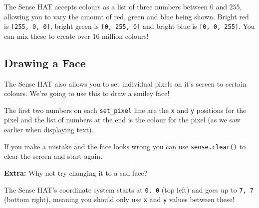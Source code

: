 		\begin{aside}
			The Sense HAT accepts colours as a list of three numbers between 0 and 255, allowing you to vary the amount of red, green and blue being shown. Bright red is \texttt{[255, 0, 0]}, bright green is \texttt{[0, 255, 0]} and bright blue is \texttt{[0, 0, 255]}. You can mix these to create over 16 million colours!
		\end{aside}

	\subsection{Drawing a Face}

		The Sense HAT also allows you to set individual pixels on it's screen to certain colours. We're going to use this to draw a smiley face!

		

		The first two numbers on each \texttt{set\_pixel} line are the \texttt{x} and \texttt{y} positions for the pixel and the list of numbers at the end is the colour for the pixel (as we saw earlier when displaying text).

		If you make a mistake and the face looks wrong you can use \texttt{sense.clear()} to clear the screen and start again.

		\textbf{Extra:} Why not try changing it to a sad face?

		\begin{aside}
			The Sense HAT's coordinate system starts at \texttt{0, 0} (top left) and goes up to \texttt{7, 7} (bottom right), meaning you should only use \texttt{x} and \texttt{y} values between these!
		\end{aside}
